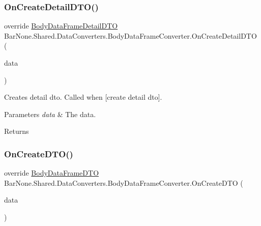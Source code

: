 \subsubsection{\texorpdfstring{On\+Create\+Detail\+D\+T\+O()}{OnCreateDetailDTO()}}
{\footnotesize\ttfamily override \mbox{\hyperlink{class_bar_none_1_1_shared_1_1_data_transfer_1_1_body_data_frame_detail_d_t_o}{Body\+Data\+Frame\+Detail\+D\+TO}} Bar\+None.\+Shared.\+Data\+Converters.\+Body\+Data\+Frame\+Converter.\+On\+Create\+Detail\+D\+TO (\begin{DoxyParamCaption}\item[{\mbox{\hyperlink{class_bar_none_1_1_shared_1_1_domain_model_1_1_body_data_frame}{Body\+Data\+Frame}}}]{data }\end{DoxyParamCaption})}



Creates detail dto. Called when \mbox{[}create detail dto\mbox{]}. 


\begin{DoxyParams}{Parameters}
{\em data} & The data.\\
\hline
\end{DoxyParams}
\begin{DoxyReturn}{Returns}

\end{DoxyReturn}
\mbox{\label{class_bar_none_1_1_shared_1_1_data_converters_1_1_body_data_frame_converter_a4f6da5fd8b4f5ea3f285b9acae6dd40b}} 
\subsubsection{\texorpdfstring{On\+Create\+D\+T\+O()}{OnCreateDTO()}}
{\footnotesize\ttfamily override \mbox{\hyperlink{class_bar_none_1_1_shared_1_1_data_transfer_1_1_body_data_frame_d_t_o}{Body\+Data\+Frame\+D\+TO}} Bar\+None.\+Shared.\+Data\+Converters.\+Body\+Data\+Frame\+Converter.\+On\+Create\+D\+TO (\begin{DoxyParamCaption}\item[{\mbox{\hyperlink{class_bar_none_1_1_shared_1_1_domain_model_1_1_body_data_frame}{Body\+Data\+Frame}}}]{data }\end{DoxyParamCaption})}



